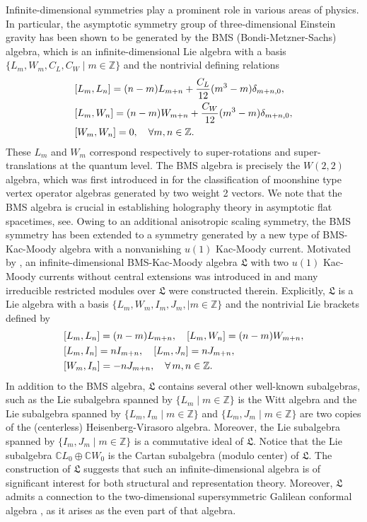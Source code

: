 \documentclass[12pt,leqno,amscd,amsfonts,amssymb]{amsart}
\def\Z{\mathbb{Z}}
\def\C{\mathbb{C}}
\numberwithin{equation}{section}
\begin{document}
Infinite-dimensional symmetries play a prominent role in  various areas of physics. In particular, the asymptotic symmetry group of three-dimensional Einstein gravity has been shown to be generated by the BMS (Bondi-Metzner-Sachs) algebra, which is an infinite-dimensional Lie algebra with a basis $\{L_m, W_m, C_L, C_W\mid m\in\Z\}$ and the nontrivial defining relations
\begin{equation*}
\aligned
&[L_m, L_n]=(n-m)L_{m+n}+\frac{C_L}{12}(m^3-m)\delta_{m+n,0},\\
&[L_m,W_n]=(n-m)W_{m+n}+\frac{C_W}{12}(m^3-m)\delta_{m+n,0},\\
&[W_m,W_n]=0, \quad \forall m, n\in\Z.
\endaligned
\end{equation*}
These $L_m$ and $W_m$ correspond respectively to super-rotations and super-translations at the quantum level. The BMS algebra is  precisely  the $W(2,2)$ algebra, which was first introduced in \cite{ZD} for the classification of moonshine type vertex operator algebras generated by two weight 2 vectors.  We note that the BMS algebra is crucial in establishing holography theory in asymptotic flat spacetimes, see\cite{B,BF,H}. Owing to an additional anisotropic scaling symmetry, the BMS symmetry has been extended to a symmetry generated by a new type of BMS-Kac-Moody algebra with a nonvanishing $u(1)$ Kac-Moody current\cite{YC}. Motivated by \cite{YC}, an infinite-dimensional BMS-Kac-Moody algebra $\mathfrak L$ with two $u(1)$  Kac-Moody currents without central extensions was introduced in \cite{LS} and many irreducible restricted modules over $\mathfrak L$ were constructed therein. Explicitly, $\mathfrak L$ is a Lie algebra with a basis $\{L_m, W_m, I_m, J_m,  \mid m\in\Z\}$ and the nontrivial Lie brackets defined by
\begin{equation*}
\aligned
&[L_m,L_n]=(n-m)L_{m+n},\quad [L_m,W_n]=(n-m)W_{m+n},\\
&[L_m,I_n]=nI_{m+n},\quad [L_m,J_n]=nJ_{m+n},\\
&[W_m,I_n]=-nJ_{m+n},\quad \forall\, m,n\in\Z.
\endaligned
\end{equation*}
In addition to the BMS algebra,  $\mathfrak L$  contains several other well-known subalgebras, such as the Lie subalgebra spanned by $\{L_m\mid m\in\Z\}$ is the Witt algebra and the Lie subalgebra spanned by $\{L_m, I_m\mid m\in\Z\}$ and   $\{L_m, J_m\mid m\in\Z\}$ are two copies of the (centerless) Heisenberg-Virasoro algebra. Moreover, the Lie subalgebra spanned by $\{I_m, J_m\mid m\in\Z\}$ is a commutative ideal of $\mathfrak L$. Notice that the Lie subalgebra $\C L_0\oplus\C W_0$  is  the Cartan subalgebra  (modulo center) of $\mathfrak{L}$. The construction of 
$\mathfrak L$ suggests that such an infinite-dimensional algebra is of significant interest for both structural and representation theory. Moreover, $\mathfrak L$ admits a connection to the two-dimensional supersymmetric Galilean conformal algebra \cite{MR}, as it arises as the even part of that algebra.
\end{document}
